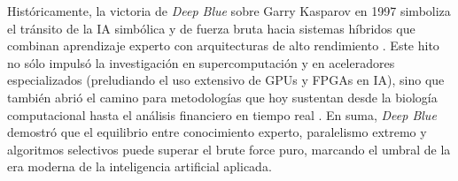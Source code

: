 \documentclass[a4paper, 12pt]{article}
\begin{document}
Históricamente, la victoria de \textit{Deep Blue} sobre Garry 
Kasparov en 1997 simboliza el tránsito de la IA simbólica y de 
fuerza bruta hacia sistemas híbridos que combinan aprendizaje 
experto con arquitecturas de alto rendimiento \cite{turn0search9}. 
Este hito no sólo impulsó la investigación en supercomputación y 
en aceleradores especializados (preludiando el uso extensivo de 
GPUs y FPGAs en IA), sino que también abrió el camino para metodologías 
que hoy sustentan desde la biología computacional hasta el 
análisis financiero en tiempo real \cite{turn0news55}\cite{turn0search8}. 
En suma, \textit{Deep Blue} demostró que el equilibrio entre 
conocimiento experto, paralelismo extremo y algoritmos 
selectivos puede superar el brute force puro, marcando el 
umbral de la era moderna de la inteligencia artificial aplicada.



\newpage

\end{document}
